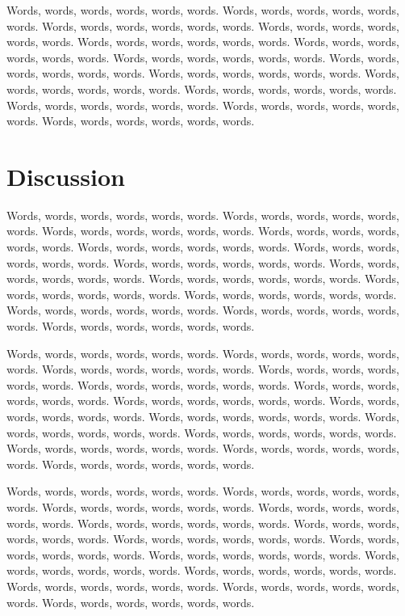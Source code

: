 \documentclass [letterpaper, 12pt] {article}
\begin{document}
Words, words, words, words, words, words. Words, words, words, words, words, words. Words, words, words, words, words, words. Words, words, words, words, words, words. Words, words, words, words, words, words. Words, words, words, words, words, words. Words, words, words, words, words, words. Words, words, words, words, words, words. Words, words, words, words, words, words. Words, words, words, words, words, words. Words, words, words, words, words, words. Words, words, words, words, words, words. Words, words, words, words, words, words. Words, words, words, words, words, words. 


\newpage

\section {Discussion}

Words, words, words, words, words, words. Words, words, words, words, words, words. Words, words, words, words, words, words. Words, words, words, words, words, words. Words, words, words, words, words, words. Words, words, words, words, words, words. Words, words, words, words, words, words. Words, words, words, words, words, words. Words, words, words, words, words, words. Words, words, words, words, words, words. Words, words, words, words, words, words. Words, words, words, words, words, words. Words, words, words, words, words, words. Words, words, words, words, words, words. 



Words, words, words, words, words, words. Words, words, words, words, words, words. Words, words, words, words, words, words. Words, words, words, words, words, words. Words, words, words, words, words, words. Words, words, words, words, words, words. Words, words, words, words, words, words. Words, words, words, words, words, words. Words, words, words, words, words, words. Words, words, words, words, words, words. Words, words, words, words, words, words. Words, words, words, words, words, words. Words, words, words, words, words, words. Words, words, words, words, words, words. 




Words, words, words, words, words, words. Words, words, words, words, words, words. Words, words, words, words, words, words. Words, words, words, words, words, words. Words, words, words, words, words, words. Words, words, words, words, words, words. Words, words, words, words, words, words. Words, words, words, words, words, words. Words, words, words, words, words, words. Words, words, words, words, words, words. Words, words, words, words, words, words. Words, words, words, words, words, words. Words, words, words, words, words, words. Words, words, words, words, words, words. 
\end{document}
